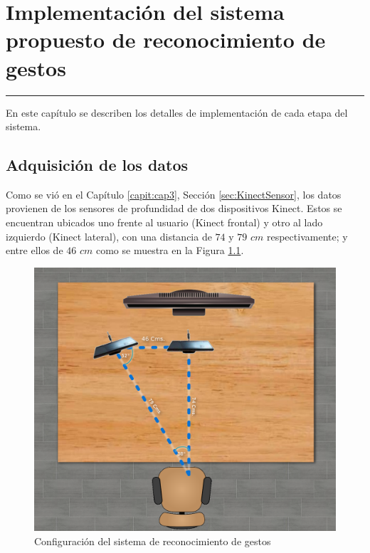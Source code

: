 \chapter{Implementación del sistema propuesto de reconocimiento de gestos}\label{capit:cap4}
\vspace{-2.0325ex}%
\noindent
\rule{\textwidth}{0.5pt}
\vspace{-5.5ex}%
\newcommand{\pushline}{\Indp}%

En este cap\'itulo se describen los detalles de implementación de cada etapa del sistema.   

\section{Adquisición de los datos}\label{sec:AdquisicionDatos}

Como se vi\'o en el Capítulo \ref{capit:cap3}, Sección \ref{sec:KinectSensor}, los datos provienen de los sensores de profundidad de dos dispositivos Kinect. Estos se encuentran ubicados uno frente al usuario (Kinect frontal) y otro al lado  izquierdo (Kinect lateral), con una distancia de $74$ y $79$ $cm$ respectivamente; y entre ellos de $46$ $cm$ como se muestra en la Figura \ref{fig:SetupSystem}.
\begin{figure}[!h]
\begin{center}
\includegraphics[scale=.2]{./Figures/system.png}
\end{center}
\caption{Configuración del sistema de reconocimiento de gestos}
\label{fig:SetupSystem}
\end{figure}  

